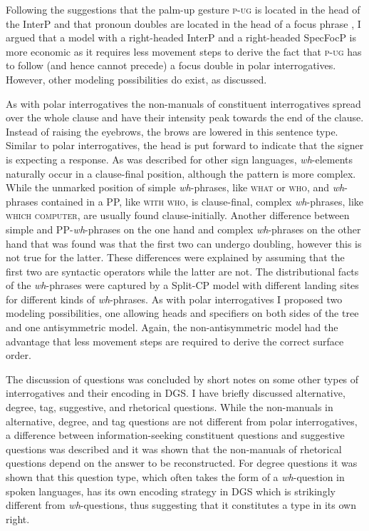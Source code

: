Following the suggestions that the palm-up gesture \textsc{p-ug} is located in the head of the InterP \citep{aboh2010sa} and that pronoun doubles are located in the head of a focus phrase \citep{de1999phrase, sandler2006sign}, I argued that a model with a right-headed InterP and a right-headed SpecFocP is more economic as it requires less movement steps to derive the fact that \textsc{p-ug} has to follow (and hence cannot precede) a focus double in polar interrogatives. However, other modeling possibilities do exist, as discussed.

As with polar interrogatives the non-manuals of constituent interrogatives spread over the whole clause and have their intensity peak towards the end of the clause. Instead of raising the eyebrows, the brows are lowered in this sentence type. Similar to polar interrogatives, the head is put forward to indicate that the signer is expecting a response. As was described for other sign languages, \textit{wh}-elements naturally occur in a clause-final position, although the pattern is more complex. While the unmarked position of simple \textit{wh}-phrases, like \textsc{what} or \textsc{who}, and \textit{wh}-phrases contained in a PP, like \textsc{with who}, is clause-final, complex \textit{wh}-phrases, like \textsc{which computer}, are usually found clause-initially. Another difference between simple and PP-\textit{wh}-phrases on the one hand and complex \textit{wh}-phrases on the other hand that was found was that the first two can undergo doubling, however this is not true for the latter. These differences were explained by assuming that the first two are syntactic operators while the latter are not. The distributional facts of the \textit{wh}-phrases were captured by a Split-CP model with different landing sites for different kinds of \textit{wh}-phrases. As with polar interrogatives I proposed two modeling possibilities, one allowing heads and specifiers on both sides of the tree and one antisymmetric model. Again, the non-antisymmetric model had the advantage that less movement steps are required to derive the correct surface order.

The discussion of questions was concluded by short notes on some other types of interrogatives and their encoding in DGS. I have briefly discussed alternative, degree, tag, suggestive, and rhetorical questions. While the non-manuals in alternative, degree, and tag questions are not different from polar interrogatives, a difference between information-seeking constituent questions and suggestive questions was described and it was shown that the non-manuals of rhetorical questions depend on the answer to be reconstructed. For degree questions it was shown that this question type, which often takes the form of a \textit{wh}-question in spoken languages, has its own encoding strategy in DGS which is strikingly different from \textit{wh}-questions, thus suggesting that it constitutes a type in its own right. 

